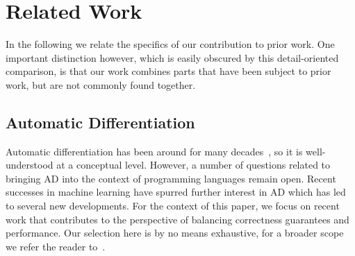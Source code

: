 \section{Related Work\label{sec:relatedwork}}

In the following we relate the specifics of our contribution to prior
work. One important distinction however, which is easily obscured by
this detail-oriented comparison, is that our work combines parts that
have been subject to prior work, but are not commonly found together.


\subsection{Automatic Differentiation}

Automatic differentiation has been around for many decades~\cite{early-ad1, early-ad2},
so it is well-understood at a conceptual level.  However,
a number of questions related to bringing AD into the context of
programming languages remain open.  Recent successes in machine learning
have spurred further interest in AD which has led to several new developments.
For the context of this paper, we focus on recent work that contributes to 
the perspective of balancing correctness guarantees and performance.
Our selection here is by no means exhaustive, for
a broader scope we refer the reader to~\cite{autodiff-survey}.

